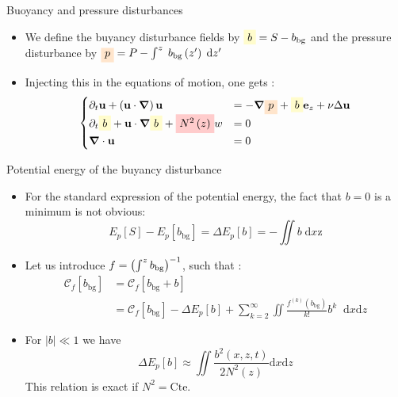 \documentclass[10pt]{beamer}
\newcommand{\NodeFill}[3]{\tikz[baseline]{\node[fill=#1!20,anchor=base](#2){#3};}}
\begin{document}
\begin{frame}{Buoyancy and pressure disturbances}
	\begin{itemize}
		\item We define the buyancy disturbance fields by $\NodeFill{yellow}{}{$b$}=S-b_{\mathrm{bg}}$  and the pressure disturbance by $\NodeFill{orange}{}{$p$}=P-\intop^{z}\;b_{\mathrm{bg}}\left(z'\right)\;\mathrm{d}z'$
		\item Injecting this in the equations of motion, one gets :
		\begin{equation*}
			\begin{cases}
				\partial_{t}\mathbf{u}+\left(\mathbf{u}\cdot\boldsymbol{\nabla}\right)\mathbf{u} &= -\boldsymbol{\nabla}\NodeFill{orange}{}{$p$}+\NodeFill{yellow}{}{$b$}\mathbf{e}_{z}+\nu\Delta\mathbf{u}\\
				\partial_{t}\NodeFill{yellow}{}{$b$}+\mathbf{u}\cdot\boldsymbol{\nabla}\NodeFill{yellow}{}{$b$}+\NodeFill{red}{}{$N^{2}\left(z\right)$}w & = 0\\
				\boldsymbol{\nabla}\cdot\mathbf{u}& =0
			\end{cases}
		\end{equation*}
	\end{itemize}
\end{frame}

\begin{frame}{Potential energy of the buyancy disturbance}
	\begin{itemize}
		\item For the standard expression of the potential energy, the fact that $b=0$ is a minimum is not obvious:
		\begin{equation*}
			E_{p}\left[S\right]-E_{p}\left[b_{\mathrm{bg}}\right]=\Delta E_{p}\left[b\right]=-\iint b \;\mathrm{d}x\mathrm{z}
		\end{equation*}
		\item Let us introduce $f=\left(\intop^{z} b_{\mathrm{bg}}\right)^{-1}$, such that :
		\begin{align*}
			\mathcal{C}_{f}\left[b_{\mathrm{bg}}\right]&=\mathcal{C}_{f}\left[b_{\mathrm{bg}}+b\right]\\
			&=\mathcal{C}_{f}\left[b_{\mathrm{bg}} \right]-\Delta E_{p}\left[b\right]+\sum_{k=2}^{\infty}\iint \frac{f^{\left(k\right)}\left(b_{\mathrm{bg}}\right)}{k!}b^{k}\;\;\mathrm{d}x\mathrm{d}z
		\end{align*}
		\item For $\left\lvert b\right\rvert\ll1$ we have 
		\begin{equation*}
			\Delta E_{p}\left[b\right]\approx \iint\frac{b^{2}\left(x,z,t\right)}{2N^{2}\left(z\right)}\mathrm{d}x\mathrm{d}z
		\end{equation*}
		This relation is exact if $N^{2}=\mathrm{Cte}$.
	\end{itemize}
\end{frame}
\end{document}
